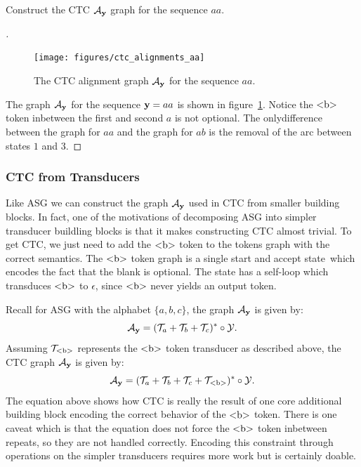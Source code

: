\begin{example}
Construct the CTC $\mathcal{A}_{\bf y}$ graph for the sequence $aa$.
\end{example}

\begin{proof}[\unskip\nopunct]

\begin{figure}
    \centering
    \texttt{[image: figures/ctc\_alignments\_aa]}
    \caption{The CTC alignment graph $\mathcal{A}_{\bf y}$ for the sequence $aa$.}
    \label{fig:ctc_alignments_aa}
\end{figure}

The graph $\mathcal{A}_{\bf y}$ for the sequence ${\bf y} = aa$ is shown in
figure~\ref{fig:ctc_alignments_aa}. Notice the $\textrm{<b>}$ token inbetween the
first and second $a$ is not optional. The onlydifference between the graph
for $aa$ and the graph for $ab$ is the removal of the arc between states
$1$ and $3$.
\end{proof}

\subsubsection{CTC from Transducers}

Like ASG we can construct the graph $\mathcal{A}_{\bf y}$ used in CTC from smaller building
blocks. In fact, one of the motivations of decomposing ASG into simpler
transducer buildling blocks is that it makes constructing CTC almost trivial.
To get CTC, we just need to add the $\textrm{<b>}$ token to the tokens graph with the
correct semantics. The $\textrm{<b>}$ token graph is a single start and accept
state which encodes the fact that the blank is optional. The state has a
self-loop which transduces $\textrm{<b>}$ to $\epsilon$, since $\textrm{<b>}$ never yields
an output token.

Recall for ASG with the alphabet $\{a, b, c\}$, the graph $\mathcal{A}_{\bf y}$ is given
by:
$$
\mathcal{A}_{\bf y} = (\mathcal{T}_a + \mathcal{T}_b + \mathcal{T}_c)^* \circ \mathcal{Y}.
$$
Assuming $\mathcal{T}_{\textrm{<b>}}$ represents the $\textrm{<b>}$ token transducer as described
above, the CTC graph $\mathcal{A}_{\bf y}$ is given by:
$$
\mathcal{A}_{\bf y} = (\mathcal{T}_a + \mathcal{T}_b + \mathcal{T}_c + \mathcal{T}_{\textrm{<b>}})^* \circ \mathcal{Y}.
$$
The equation above shows how CTC is really the result of one core additional
building block encoding the correct behavior of the $\textrm{<b>}$ token. There is
one caveat which is that the equation does not force the $\textrm{<b>}$ token
inbetween repeats, so they are not handled correctly. Encoding this constraint
through operations on the simpler transducers requires more work but is
certainly doable.
